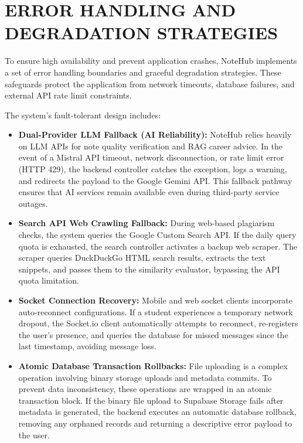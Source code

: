 \documentclass[12,Times new Roman,a4paper]{report}
\begin{document}
\section{ERROR HANDLING AND DEGRADATION STRATEGIES}

To ensure high availability and prevent application crashes, NoteHub implements a set of error handling boundaries and graceful degradation strategies. These safeguards protect the application from network timeouts, database failures, and external API rate limit constraints.

The system's fault-tolerant design includes:
\begin{itemize}
    \item \textbf{Dual-Provider LLM Fallback (AI Reliability):} NoteHub relies heavily on LLM APIs for note quality verification and RAG career advice. In the event of a Mistral API timeout, network disconnection, or rate limit error (HTTP 429), the backend controller catches the exception, logs a warning, and redirects the payload to the Google Gemini API. This fallback pathway ensures that AI services remain available even during third-party service outages.
    \item \textbf{Search API Web Crawling Fallback:} During web-based plagiarism checks, the system queries the Google Custom Search API. If the daily query quota is exhausted, the search controller activates a backup web scraper. The scraper queries DuckDuckGo HTML search results, extracts the text snippets, and passes them to the similarity evaluator, bypassing the API quota limitation.
    \item \textbf{Socket Connection Recovery:} Mobile and web socket clients incorporate auto-reconnect configurations. If a student experiences a temporary network dropout, the Socket.io client automatically attempts to reconnect, re-registers the user's presence, and queries the database for missed messages since the last timestamp, avoiding message loss.
    \item \textbf{Atomic Database Transaction Rollbacks:} File uploading is a complex operation involving binary storage uploads and metadata commits. To prevent data inconsistency, these operations are wrapped in an atomic transaction block. If the binary file upload to Supabase Storage fails after metadata is generated, the backend executes an automatic database rollback, removing any orphaned records and returning a descriptive error payload to the user.
\end{itemize}
\end{document}
